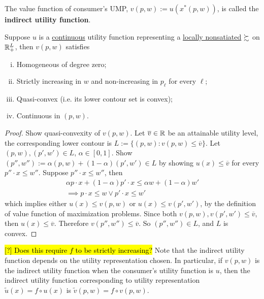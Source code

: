 \documentclass{article}
\begin{document}
 			\begin{definition}
 				The value function of consumer's UMP, $v(p, w) := u(x^*(p, w))$, is called the \textbf{indirect utility function}.
 			\end{definition}
 			
 			\begin{proposition}[3.D.3]
 				Suppose $u$ is a \ul{continuous} utility function representing a \ul{locally nonsatiated} $\succsim$ on $\mathbb{R}^L_+$, then $v(p, w)$ satisfies
 				\begin{enumerate}[(i)]
 					\item Homogeneous of degree zero;
 					\item Strictly increasing in $w$ and non-increasing in $p_\ell$ for every $\ell$;
 					\item Quasi-convex (i.e. its lower contour set is convex);
 					\item Continuous in $(p, w)$.
 				\end{enumerate}
 			\end{proposition}
 			
 			\begin{proof}
 				Show quasi-convexity of $v(p, w)$. Let $\overline{v} \in \mathbb{R}$ be an attainable utility level, the corresponding lower contour is $L :=\{(p, w) : v(p, w) \leq \overline{v}\}$. Let $(p, w), (p', w') \in L$, $\alpha \in [0, 1]$. Show $(p'', w'') := \alpha(p, w) + (1-\alpha)(p', w') \in L$ by showing $u(x) \leq \overline{v}$ for every $p'' \cdot x \leq w''$. Suppose $p'' \cdot x \leq w''$, then
 				\begin{align}
 					\alpha p \cdot x + (1-\alpha) p' \cdot x \leq \alpha w + (1-\alpha)w' \\
 					\implies p \cdot x \leq w \lor p' \cdot x \leq w'
 				\end{align}
 				which implies either $u(x) \leq v(p, w)$ or $u(x) \leq v(p' ,w')$, by the definition of value function of maximization problems. Since both $v(p,w), v(p',w') \leq \overline{v}$, then $u(x) \leq \overline{v}$. Therefore $v(p'', w'') \leq \overline{v}$. So $(p'', w'') \in L$, and $L$ is convex.
 			\end{proof}
 			
 			\begin{proposition}[Transformation on $v$]
 				\hl{[?] Does this require $f$ to be strictly increasing?}
 				Note that the indirect utility function depends on the utility representation chosen. In particular, if $v(p, w)$ is the indirect utility function when the consumer's utility function is $u$, then the indirect utility function corresponding to utility representation $\tilde{u}(x) = f \circ u(x)$ is $\tilde{v}(p, w) = f \circ v(p, w)$. 
 			\end{proposition}
 			
\end{document}
